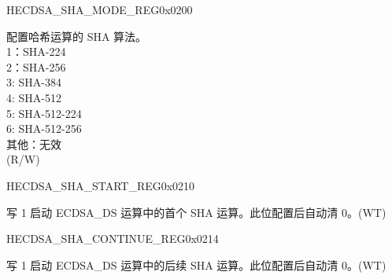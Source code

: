 \begin{register}{H}{ECDSA\_SHA\_MODE\_REG}{0x0200}\label{regdesc:ECDSASHAMODEREG}
%
%
\regnewline%
\begin{regdesc}\begin{reglist}
\label{fielddesc:ECDSASHAMODE}\item [ECDSA\_SHA\_MODE] 配置哈希运算的 SHA 算法。\\
1：SHA-224\\
2：SHA-256\\
3: SHA-384\\
4: SHA-512\\
5: SHA-512-224\\
6: SHA-512-256\\
其他：无效\\
(R/W)
\end{reglist}\end{regdesc}
\end{register}


\begin{register}{H}{ECDSA\_SHA\_START\_REG}{0x0210}\label{regdesc:ECDSASHASTARTREG}
%
%
\regnewline%
\begin{regdesc}\begin{reglist}
\label{fielddesc:ECDSASHASTART}\item [ECDSA\_SHA\_START] 写 1 启动 ECDSA\_DS 运算中的首个 SHA 运算。此位配置后自动清 0。(WT)
\end{reglist}\end{regdesc}
\end{register}


\begin{register}{H}{ECDSA\_SHA\_CONTINUE\_REG}{0x0214}\label{regdesc:ECDSASHACONTINUEREG}
%
%
\regnewline%
\begin{regdesc}\begin{reglist}
\label{fielddesc:ECDSASHACONTINUE}\item [ECDSA\_SHA\_CONTINUE] 写 1 启动 ECDSA\_DS 运算中的后续 SHA 运算。此位配置后自动清 0。(WT)
\end{reglist}\end{regdesc}
\end{register}


